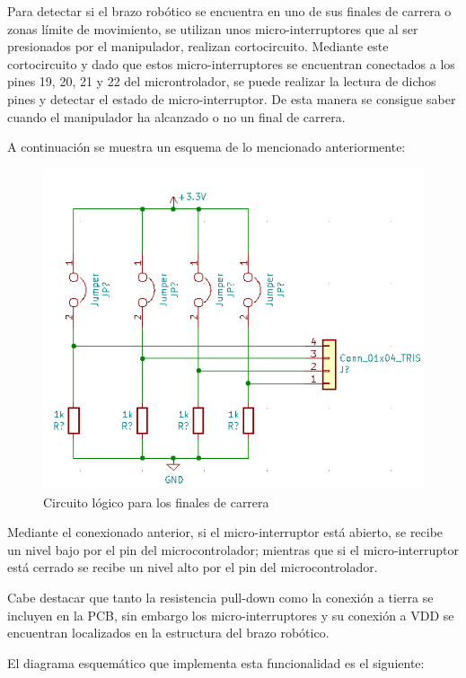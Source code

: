 \begin{itemize}
    Para detectar si el brazo robótico se encuentra en uno de sus finales de carrera o zonas límite de movimiento, se utilizan unos micro-interruptores que al ser presionados por el manipulador, realizan cortocircuito. Mediante este cortocircuito y dado que estos micro-interruptores se encuentran conectados a los pines 19, 20, 21 y 22 del microntrolador, se puede realizar la lectura de dichos pines y detectar el estado de micro-interruptor. De esta manera se consigue saber cuando el manipulador ha alcanzado o no un final de carrera.
    
    A continuación se muestra un esquema de lo mencionado anteriormente:
    
    \begin{figure}[H]
    \centering 
    \includegraphics[width=.64
    \linewidth]{pictures/MicroSwitchesSchematic.PNG}
    \caption{Circuito lógico para los finales de carrera}
    \label{fig:kdiagram}
    \end{figure}
    
    Mediante el conexionado anterior, si el micro-interruptor está abierto, se recibe un nivel bajo por el pin del microcontrolador; mientras que si el micro-interruptor está cerrado se recibe un nivel alto por el pin del microcontrolador. 
    
    Cabe destacar que tanto la resistencia pull-down como la conexión a tierra se incluyen en la PCB, sin embargo los micro-interruptores y su conexión a VDD se encuentran localizados en la estructura del brazo robótico. 
    
    El diagrama esquemático que implementa esta funcionalidad es el siguiente:
    

\end{itemize}
